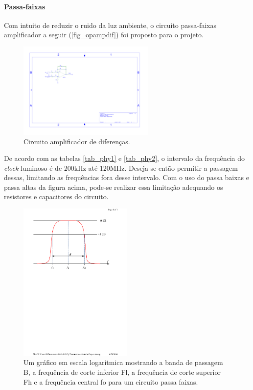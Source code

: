 	\paragraph{Passa-faixas}
	Com intuito de reduzir o ruido da luz ambiente, o circuito passa-faixas amplificador a seguir (\autoref{fig_opampdif}) foi proposto para o projeto.
	
	\begin{figure}[h!]
		\caption{\label{fig_opampdif}Circuito amplificador de diferenças.}
		\centering
		\includegraphics[width=0.6\textwidth, trim={5cm 12.29cm 17.6cm 4.3cm},clip]{circuits/opamp-dif2.pdf}
	\end{figure}
	
	De acordo com as tabelas \ref{tab_phy1} e \ref{tab_phy2}, o intervalo da frequência do \textit{clock} luminoso é de 200kHz até 120MHz. Deseja-se então  permitir a passagem dessas, limitando as frequências fora desse intervalo. Com o uso do passa baixas e passa altas da figura acima, pode-se realizar essa limitação adequando os resistores e capacitores do circuito.
	
	\begin{figure}[htb]
		\caption{\label{fig_frequenciacentral}Um gráfico em escala logaritmica mostrando a banda de passagem B, a frequência de corte inferior Fl, a frequência de corte superior Fh e a frequência central fo para um circuito passa faixas.}
		\centering
		\includegraphics[width=0.5\textwidth, trim={4.5cm 17cm 3.3cm 2cm},clip]{circuits/freq-corte.pdf}
	\end{figure}
	
